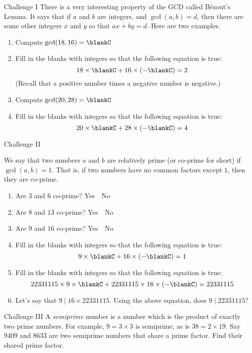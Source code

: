 \documentclass[12pt,letterpaper]{article}
\begin{document}
\begin{problem}{Challenge I}
 There is a very interesting property of the GCD called B\'ezout's Lemma. It
 says that if $a$ and $b$ are integers, and $\gcd(a, b) = d$, then there are
 some other integers $x$ and $y$ so that $ax + by = d$. Here are two examples.

 \begin{enumerate}
  \item Compute $\gcd(18, 16) = \blankC$
  \item Fill in the blanks with integers so that the following equation is true:
  \[ 18 \times \blankC + 16 \times (- \blankC) = 2 \]
  (Recall that a positive number times a negative number is negative.)
  \item Compute $\gcd(20, 28) = \blankC$
  \item Fill in the blanks with integers so that the following equation is true:
  \[ 20 \times \blankC + 28 \times (- \blankC) = 4 \]
 \end{enumerate}
\end{problem}

\begin{problem}{Challenge II}

 We say that two numbers $a$ and $b$ are relatively prime (or co-prime for
 short) if $\gcd(a, b) = 1$. That is, if two numbers have no common factors
 except $1$, then they are co-prime.

 \begin{enumerate}
  \item Are $3$ and $6$ co-prime?  \hfill Yes~~No
  \item Are $8$ and $13$ co-prime? \hfill Yes~~No
  \item Are $9$ and $16$ co-prime? \hfill Yes~~No
  \item Fill in the blanks with integers so that the following equation is true:
  \[ 9 \times \blankC + 16 \times (-\blankC) = 1 \]
  \item Fill in the blanks with integers so that the following equation is true:
  \[ 22331115 \times 9 \times \blankC + 22331115 \times 16 \times (-\blankC) =
  22331115 \]
  \item Let's say that $9 \mid 16\times22331115$. Using the above equation,
  does $9\mid22331115$?
 \end{enumerate}
\end{problem}

\begin{problem}{Challenge III}
 A \emph{semiprime} number is a number which is the product of exactly two prime
 numbers. For example, $9=3\times3$ is semiprime, as is $38=2\times19$. Say
 $9409$ and $8633$ are two semiprime numbers that share a prime factor. Find
 their shared prime factor.
\end{problem}
\end{document}
